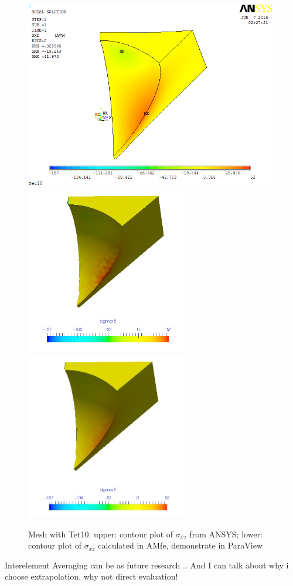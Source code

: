 \begin{figure}[htbp]
	\begin{center}
		\includegraphics[width=11cm,clip]{Tet10_Sxz.png} 		
		\includegraphics[width=7cm,clip]{Tet10_Sxz_PD.png} 	
		\includegraphics[width=7cm,clip]{Tet10_Sxz_P.png} 		
		\caption{Mesh with Tet10. upper: contour plot of $\sigma_{xz}$ from ANSYS; lower: contour plot of $\sigma_{xz}$ calculated in AMfe, demonstrate in ParaView} \label{fig: Tet10_Sxz}
	\end{center}
\end{figure}

\clearpage 




\cite[p. 18]{bibid}
Interelement Averaging can be as future research ..
And I can talk about why i choose extrapolation, why not direct evaluation!
\cite[p. 1-10]{Johannes} \cite{Felippa}